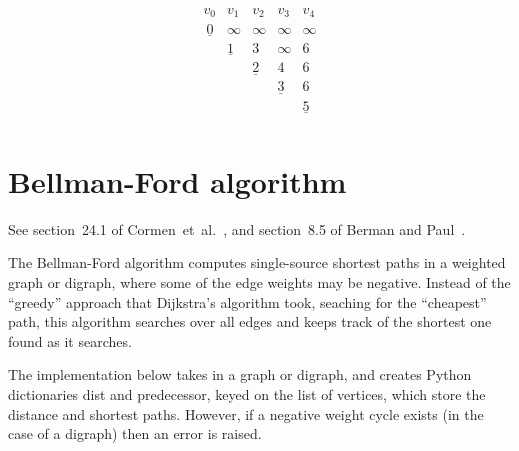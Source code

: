 \begin{exercise}
{\[
\begin{array}{ccccc}
v_0  & v_1  & v_2     &  v_3     & v_4  \\\
\underline{0}    & \infty & \infty & \infty & \infty \\
      & \underline{1}      & 3        & \infty & 6 \\
      &     &    \underline{2}    &  4     &    6       \\
      &     &                            &  \underline{3}     &   6      \\
      &          &            &           & \underline{5}  \\
\end{array}
\]
}
\end{exercise}


\section{Bellman-Ford algorithm}

See section~24.1 of Cormen~et~al.~\cite{CormenEtAl2001}, and
section~8.5 of Berman and Paul~\cite{BermanPaul1997}.

The Bellman-Ford algorithm computes single-source shortest paths in a weighted 
graph or digraph, where some of the edge weights may be negative.
Instead of the ``greedy'' approach that Dijkstra's algorithm took, 
seaching for the ``cheapest'' path, this algorithm searches over all
edges and keeps track of the shortest one found as it searches.

The implementation below takes in a graph or digraph, and creates Python
dictionaries dist and predecessor, keyed on the list of vertices, 
which store the distance and shortest paths. However, if a 
negative weight cycle exists (in the case of a digraph) then 
an error is raised.


